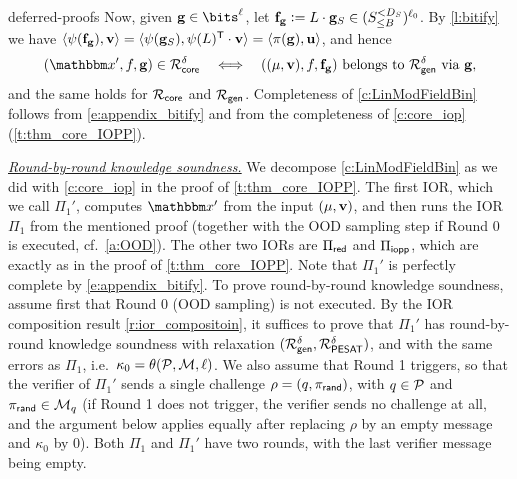 \begin{lncsappendix}{deferred-proofs}
Now, given  $\bfg\in \bits^{\codedim}$, let $\mathbf{f}_{\mathbf{g}}{\;\vcentcolon=\;} L\cdot \mathbf{g}_S\in ({S_{\leq B}^{<D_S}})^{\ell_0}$. By \cref{l:bitify} we have $\langle \psi(\mathbf{f}_{\mathbf{g}}), \mathbf{v}\rangle = \langle \psi(\mathbf{g}_S), \psi(L)^{\mathsf{T}}\cdot \mathbf{v}\rangle = \langle \pi(\mathbf{g}),\mathbf{u}\rangle$, and hence
%
\begin{equation}\label{e:appendix_bitify}
(\inp', f, \bfg)\in \Relation_{\mathsf{core}}^{\delta} \quad \Longleftrightarrow\quad  ((\mu, \vv), f, \bff_{\bfg}) \text{ belongs to } \Relation_{\mathsf{gen}}^{\delta} \text{ via } \bfg,
\end{equation}
%
and the same holds for $\mathcal{R}_{\mathsf{core}}$ and $\mathcal{R}_{\mathsf{gen}}$. Completeness of \cref{c:LinModFieldBin} follows from \eqref{e:appendix_bitify} and from the completeness of \cref{c:core_iop} (\cref{t:thm_core_IOPP}).

\bigskip

\noindent \emph{\underline{Round-by-round knowledge soundness.}} We decompose \cref{c:LinModFieldBin} as we did with \cref{c:core_iop} in the proof of \cref{t:thm_core_IOPP}. The first IOR, which we call $\Pi_1'$, computes $\inp'$ from the input $(\mu,\mathbf{v})$, and then runs the IOR $\Pi_1$ from the mentioned proof (together with the OOD sampling step if Round 0 is executed, cf.\ \cref{a:OOD}). The other two IORs are $\Pi_{\mathsf{red}}$ and $\Pi_{\mathsf{iopp}}$, which are exactly as in the proof of \cref{t:thm_core_IOPP}. Note that $\Pi_1'$ is perfectly complete by \eqref{e:appendix_bitify}.
To prove round-by-round knowledge soundness, assume first that Round 0 (OOD sampling) is not executed. By the IOR composition result \cref{r:ior_compositoin}, it suffices to prove that $\Pi_1'$ has round-by-round knowledge soundness with relaxation $(\mathcal{R}_{\mathsf{gen}}^{\delta},\mathcal{R}_{\mathsf{PESAT}}^{\delta})$, and with the same errors as $\Pi_1$, i.e.\ $\kappa_0=\theta(\mathcal{P},\mathcal{M},\ell)$. We also assume that Round 1 triggers, so that the verifier of $\Pi_1'$ sends a single challenge $\rho=(q,\pi_{\mathsf{rand}})$, with $q\in\mathcal{P}$ and $\pi_{\mathsf{rand}}\in\mathcal{M}_q$ (if Round 1 does not trigger, the verifier sends no challenge at all, and the argument below applies equally after replacing $\rho$ by an empty message and $\kappa_0$ by $0$). Both $\Pi_1$ and $\Pi_1'$ have two rounds, with the last verifier message being empty.



\end{lncsappendix}
